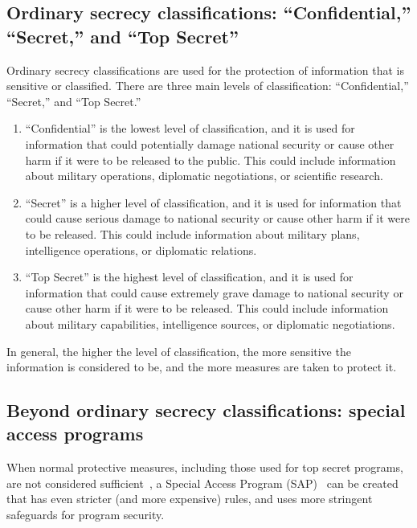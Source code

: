 \subsection{Ordinary secrecy classifications: ``Confidential,'' ``Secret,'' and ``Top Secret''}

Ordinary secrecy classifications are used for the protection of information that is sensitive or classified. There are three main levels of classification: ``Confidential,'' ``Secret,'' and ``Top Secret.''

\begin{enumerate}
\item
``Confidential'' is the lowest level of classification, and it is used for information that could potentially damage national security or cause other harm if it were to be released to the public. This could include information about military operations, diplomatic negotiations, or scientific research.

\item
``Secret'' is a higher level of classification, and it is used for information that could cause serious damage to national security or cause other harm if it were to be released. This could include information about military plans, intelligence operations, or diplomatic relations.

\item
``Top Secret'' is the highest level of classification, and it is used for information that could cause extremely grave damage to national security or cause other harm if it were to be released. This could include information about military capabilities, intelligence sources, or diplomatic negotiations.
\end{enumerate}
In general, the higher the level of classification, the more sensitive the information is considered to be, and the more measures are taken to protect it.

\subsection{Beyond ordinary secrecy classifications: special access programs}

When normal protective measures, including those used for top secret programs, are not considered sufficient~\cite{vanderReijden2005},
a Special Access Program (SAP)~\cite{DCSA-SAPguide,DODDirective5205.07} can be created that has even stricter (and more expensive) rules, and uses more stringent safeguards for program security.

